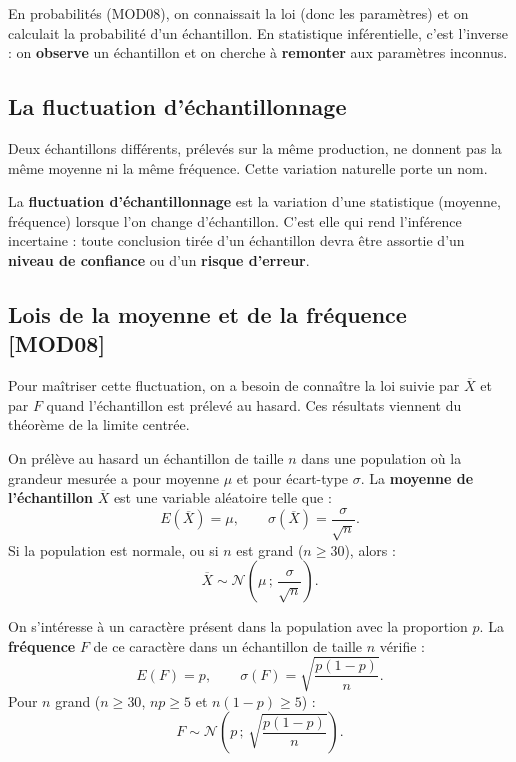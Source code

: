 \documentclass[a4paper,11pt]{article}
\begin{document}
\begin{remarque}
En probabilités (MOD08), on connaissait la loi (donc les paramètres) et on calculait la probabilité d'un échantillon. En statistique inférentielle, c'est l'inverse : on \textbf{observe} un échantillon et on cherche à \textbf{remonter} aux paramètres inconnus.
\end{remarque}

\subsection{La fluctuation d'échantillonnage}

Deux échantillons différents, prélevés sur la même production, ne donnent pas la même moyenne ni la même fréquence. Cette variation naturelle porte un nom.

\begin{definition}
La \textbf{fluctuation d'échantillonnage} est la variation d'une statistique (moyenne, fréquence) lorsque l'on change d'échantillon. C'est elle qui rend l'inférence incertaine : toute conclusion tirée d'un échantillon devra être assortie d'un \textbf{niveau de confiance} ou d'un \textbf{risque d'erreur}.
\end{definition}

\subsection{Lois de la moyenne et de la fréquence \hfill {\normalsize\color{uimmred}[MOD08]}}

Pour maîtriser cette fluctuation, on a besoin de connaître la loi suivie par $\overline{X}$ et par $F$ quand l'échantillon est prélevé au hasard. Ces résultats viennent du théorème de la limite centrée.

\begin{theoreme}
On prélève au hasard un échantillon de taille $n$ dans une population où la grandeur mesurée a pour moyenne $\mu$ et pour écart-type $\sigma$. La \textbf{moyenne de l'échantillon} $\overline{X}$ est une variable aléatoire telle que :
\[
E(\overline{X}) = \mu, \qquad \sigma(\overline{X}) = \frac{\sigma}{\sqrt{n}}.
\]
Si la population est normale, ou si $n$ est grand ($n \geq 30$), alors :
\[
\boxed{\overline{X} \sim \mathcal{N}\!\left(\mu\,;\,\frac{\sigma}{\sqrt{n}}\right).}
\]
\end{theoreme}

\begin{theoreme}
On s'intéresse à un caractère présent dans la population avec la proportion $p$. La \textbf{fréquence} $F$ de ce caractère dans un échantillon de taille $n$ vérifie :
\[
E(F) = p, \qquad \sigma(F) = \sqrt{\frac{p(1-p)}{n}}.
\]
Pour $n$ grand ($n \geq 30$, $np \geq 5$ et $n(1-p) \geq 5$) :
\[
\boxed{F \sim \mathcal{N}\!\left(p\,;\,\sqrt{\frac{p(1-p)}{n}}\right).}
\]
\end{theoreme}
\end{document}
